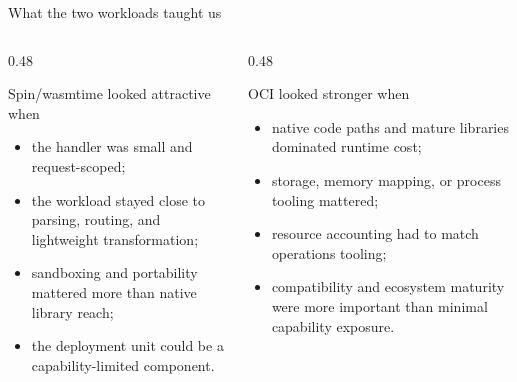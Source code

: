 \documentclass[aspectratio=169,10pt]{beamer}
\begin{document}
\begin{frame}{What the two workloads taught us}
  \begin{columns}[T,onlytextwidth]
    \begin{column}{0.48\linewidth}
      \begin{exampleblock}{Spin/wasmtime looked attractive when}
        \begin{itemize}
          \item the handler was small and request-scoped;
          \item the workload stayed close to parsing, routing, and lightweight transformation;
          \item sandboxing and portability mattered more than native library reach;
          \item the deployment unit could be a capability-limited component.
        \end{itemize}
      \end{exampleblock}
    \end{column}
    \begin{column}{0.48\linewidth}
      \begin{alertblock}{OCI looked stronger when}
        \begin{itemize}
          \item native code paths and mature libraries dominated runtime cost;
          \item storage, memory mapping, or process tooling mattered;
          \item resource accounting had to match operations tooling;
          \item compatibility and ecosystem maturity were more important than minimal capability exposure.
        \end{itemize}
      \end{alertblock}
    \end{column}
  \end{columns}
\end{frame}
\end{document}
